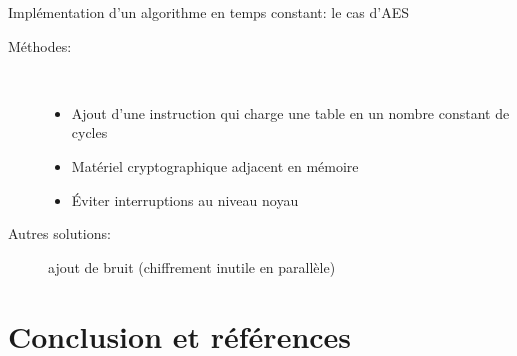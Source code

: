 \documentclass[11pt]{beamer}
\begin{document}
\begin{frame}{Implémentation d'un algorithme en temps constant: le cas d'AES}
\begin{description}
\item [Méthodes:]~\\
\begin{itemize}
\item Ajout d'une instruction qui charge une table en un nombre constant de cycles~\cite{bernstein2005cache}
\item Matériel cryptographique adjacent en mémoire
\item Éviter interruptions au niveau noyau
\end{itemize}
\item[Autres solutions:] ajout de bruit (chiffrement inutile en parallèle)
\end{description}
\end{frame}


\section*{Conclusion et  références}
\end{document}
